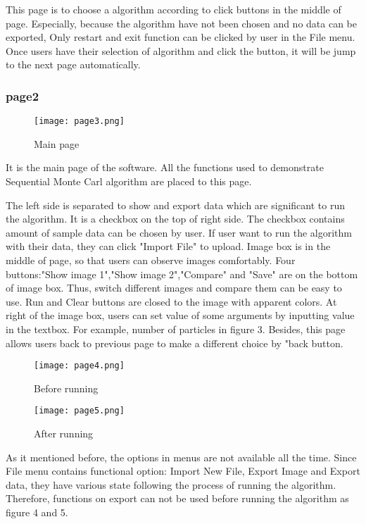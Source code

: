 \documentclass{article}
\begin{document}
        This page is to choose a algorithm according to click buttons in the middle of page. Especially, because the algorithm have not been chosen and no data can be exported, Only restart and exit function can be clicked by user in the File menu. Once users have their selection of algorithm and click the button, it will be jump to the next page automatically.
    
        \subsubsection{page2}
        \begin{figure}[ht]
            \centering
            \texttt{[image: page3.png]}
            \caption{Main page}
            \label{fig:label2}
        \end{figure}
        
        It is the main page of the software. All the functions used to demonstrate Sequential Monte Carl algorithm are placed to this page. 
        
        The left side is separated to show and export data which are significant to run the algorithm. It is a checkbox on the top of right side. The checkbox contains amount of sample data can be chosen by user. If user want to run the algorithm with their data, they can click "Import File" to upload. Image box is in the middle of page, so that users can observe images comfortably. Four buttons:"Show image 1","Show image 2","Compare" and "Save" are on the bottom of image box. Thus, switch different images and compare them can be easy to use. Run and Clear buttons are closed to the image with apparent colors. At right of the image box, users can set value of some arguments by inputting value in the textbox. For example, number of particles in figure 3. Besides, this page allows users back to previous page to make a different choice by "back button. 


    \begin{figure}[ht]
        \centering
        \texttt{[image: page4.png]}
        \caption{Before running}
        \label{fig:label3}
    \end{figure}

    \begin{figure}[ht]
        \centering
        \texttt{[image: page5.png]}
        \caption{After running}
        \label{fig:label4}
    \end{figure}

        As it mentioned before, the options in menus are not available all the time. Since File menu contains functional option: Import New File, Export Image and Export data, they have various state following the process of running the algorithm. Therefore, functions on export can not be used before running the algorithm as figure 4 and 5.
\end{document}
